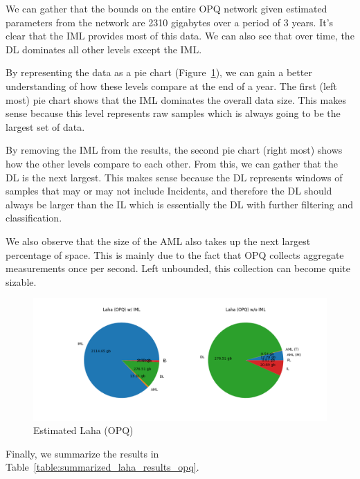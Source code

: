We can gather that the bounds on the entire OPQ network given estimated parameters from the network are 2310 gigabytes over a period of 3 years. It's clear that the IML provides most of this data. We can also see that over time, the DL dominates all other levels except the IML\@.

By representing the data as a pie chart (Figure~\ref{fig:plot_lala_opq_pie}), we can gain a better understanding of how these levels compare at the end of a year. The first (left most) pie chart shows that the IML dominates the overall data size. This makes sense because this level represents raw samples which is always going to be the largest set of data.

By removing the IML from the results, the second pie chart (right most) shows how the other levels compare to each other. From this, we can gather that the DL is the next largest. This makes sense because the DL represents windows of samples that may or may not include Incidents, and therefore the DL should always be larger than the IL which is essentially the DL with further filtering and classification.

We also observe that the size of the AML also takes up the next largest percentage of space. This is mainly due to the fact that OPQ collects aggregate measurements once per second. Left unbounded, this collection can become quite sizable.

\begin{figure}[H]
	\centering
	\includegraphics[width=\linewidth]{figures/plot_laha_opq_pie.png}
	\caption{Estimated Laha (OPQ)}
	\label{fig:plot_lala_opq_pie}
\end{figure}

Finally, we summarize the results in Table~\ref{table:summarized_laha_results_opq}.

